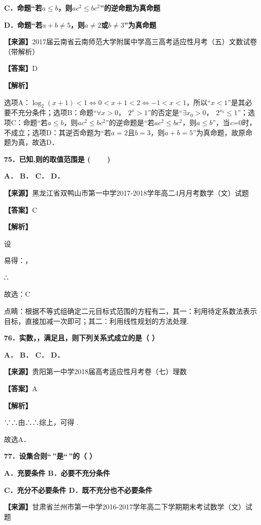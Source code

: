 \textbf{C．命题``若}\(a \leq b\)\textbf{，则}\(ac^{2} \leq bc^{2}\)\textbf{''的逆命题为真命题}

\textbf{D．命题``若}\(a + b \neq 5\)\textbf{，则}\(a \neq 2\)\textbf{或}\(b \neq 3\)\textbf{''为真命题}

\textbf{【来源】}2017届云南省云南师范大学附属中学高三高考适应性月考（五）文数试卷（带解析）

\textbf{【答案】}D

\textbf{【解析】}

选项A：\(\log_{2}(x + 1) < 1 \Leftrightarrow 0 < x + 1 < 2 \Leftrightarrow - 1 < x < 1\)，所以``\(x < 1\)''是其必要不充分条件；选项B：命题``\(\forall x > 0，\text{  }2^{x} > 1\)''的否定是``\(\exists x_{0} > 0，\text{  }2^{x_{0}} \leq 1\)''；选项C：命题``若\(a \leq b\)，则\(ac^{2} \leq bc^{2}\)''的逆命题是``若\(ac^{2} \leq bc^{2}\)，则\(a \leq b\)''，当\emph{c}=0时，不成立；选项D：其逆否命题为``若\(a = 2\)且\(b = 3\)，则\(a + b = 5\)''为真命题，故原命题为真，故选D．

\textbf{75．已知,则的取值范围是 (　 　)}

\textbf{A． B． C． D．}

\textbf{【来源】}黑龙江省双鸭山市第一中学2017-2018学年高二4月月考数学（文）试题

\textbf{【答案】}C

\textbf{【解析】}

设

易得：，

∴

故选：C

点睛：根据不等式组确定二元目标式范围的方程有二，其一：利用待定系数法表示目标，直接加减一次即可；其二：利用线性规划的方法处理.

\textbf{76．实数，，满足且，则下列关系式成立的是（ ）}

\textbf{A． B． C． D．}

\textbf{【来源】}贵阳第一中学2018届高考适应性月考卷（七）理数

\textbf{【答案】}A

\textbf{【解析】}

∵∴由∴∴综上，可得 .

故选A．

\textbf{77．设集合则``\,''是``\,''的（ ）}

\textbf{A．充要条件 B．必要不充分条件}

\textbf{C．充分不必要条件 D．既不充分也不必要条件}

\textbf{【来源】}甘肃省兰州市第一中学2016-2017学年高二下学期期末考试数学（文）试题

